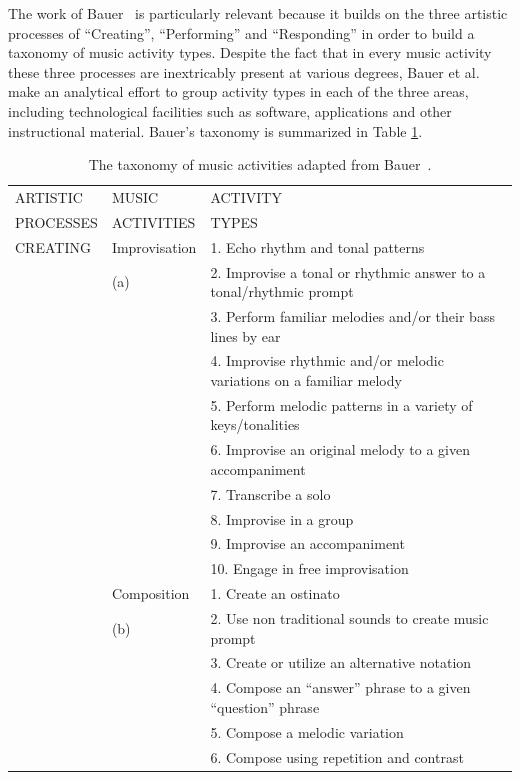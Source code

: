 \documentclass[journal]{IEEEtran}
\begin{document}
The work of Bauer~\cite{bauer2014music} is particularly relevant because it builds on the three artistic processes of ``Creating'', ``Performing'' and ``Responding'' in order to build a taxonomy of music activity types. Despite the fact that in every music activity these three processes are inextricably present at various degrees, Bauer et al. 
\cite{bauerharris} make an analytical effort to group activity types in each of the three areas, including technological facilities such as software, applications and other instructional material. Bauer's taxonomy is summarized in Table \ref{tab:bauer}.
\begin{table}[htbp]
	\caption{The taxonomy of music activities adapted from Bauer~\cite{bauerharris, bauer2014music}.}
	\label{tab:bauer}
	\centering
	\begin{tabular}{p{}p{}p{}}
		ARTISTIC  & MUSIC & ACTIVITY \\
		PROCESSES  & ACTIVITIES & TYPES \\
		\hline\noalign{\smallskip}
		CREATING & Improvisation & 1. Echo rhythm and tonal patterns\\
		& (a) & 2. Improvise a tonal or rhythmic answer to a tonal/rhythmic prompt\\
		& & 3. Perform familiar melodies and/or their bass lines by ear\\
		& & 4. Improvise rhythmic and/or melodic variations on a familiar melody\\
		& & 5. Perform melodic patterns in a variety of keys/tonalities\\
		& & 6. Improvise an original melody to a given accompaniment\\
		& & 7. Transcribe a solo\\
		& & 8. Improvise in a group\\
		& & 9. Improvise an accompaniment\\
		& & 10. Engage in free improvisation\\
		
		\cline{2-3}
		
		& Composition & 1. Create an ostinato\\
		& (b) & 2. Use non traditional sounds to create music prompt\\
		& & 3. Create or utilize an alternative notation\\
		& & 4. Compose an ``answer'' phrase to a given ``question'' phrase\\
		& & 5. Compose a melodic variation\\
		& & 6. Compose using repetition and contrast\\
		

\end{tabular}
\end{table}
\end{document}
